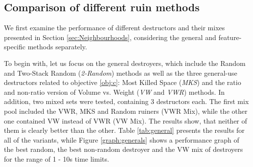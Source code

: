 \documentclass[preprint,11pt,3p]{elsarticle}
\begin{document}
\subsection{Comparison of different ruin methods}
We first examine the performance of different destructors and their mixes presented in Section \ref{sec:Neighbourhoods}, considering the general and feature-specific methods separately.

To begin with, let us focus on the general destroyers, which include the Random and Two-Stack Random (\textit{2-Random}) methods as well as the three general-use destructors related to objective \ref{obj:c}: Most Killed Space (\textit{MKS}) and the ratio and non-ratio version of Volume vs. Weight (\textit{VW} and \textit{VWR}) methods. In addition, two mixed sets were tested, containing 3 destructors each. The first mix pool included the VWR, MKS and Random ruiners (VWR Mix), while the other one contained VW instead of VWR (VW Mix). The results show, that neither of them is clearly better than the other. Table \ref{tab:general} presents the results for all of the variants, while Figure \ref{graph:generals} shows a performance graph of the best random, the best non-random destroyer and the VW mix of destroyers for the range of 1 - 10s time limits. 
\end{document}
